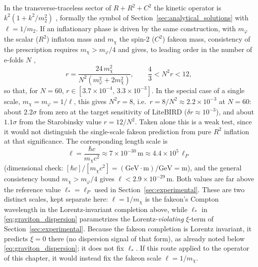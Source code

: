 \documentclass[11pt,a4paper,reqno]{amsart}
\theoremstyle{definition}
\numberwithin{equation}{section}
\begin{document}
In the transverse-traceless sector of $R + R^2 + C^2$ the kinetic operator is $k^2(1 + k^2/m_2^2)$ \cite{Stelle1978}, formally the symbol of Section~\ref{sec:analytical_solutions} with $\ell = 1/m_2$. If an inflationary phase is driven by the same construction, with $m_\varphi$ the scalar ($R^2$) inflaton mass and $m_\chi$ the spin-2 ($C^2$) fakeon mass, consistency of the prescription requires $m_\chi > m_\varphi/4$ and gives, to leading order in the number of e-folds $N$ \cite{ABP2020},
\begin{equation}
    \label{eq:fakeon_r}
    r = \frac{24\, m_\chi^2}{N^2\left( m_\varphi^2 + 2 m_\chi^2 \right)}, \qquad \frac{4}{3} < N^2 r < 12,
\end{equation}
so that, for $N = 60$, $r \in [3.7 \times 10^{-4},\, 3.3 \times 10^{-3}]$. In the special case of a single scale, $m_\chi = m_\varphi = 1/\ell$, this gives $N^2 r = 8$, i.e.\ $r = 8/N^2 \approx 2.2 \times 10^{-3}$ at $N = 60$: about $2.2\sigma$ from zero at the target sensitivity of LiteBIRD ($\delta r \approx 10^{-3}$), and about $1.1\sigma$ from the Starobinsky value $r = 12/N^2$. Taken alone this is a weak test, since it would not distinguish the single-scale fakeon prediction from pure $R^2$ inflation at that significance. The corresponding length scale is
\begin{equation}
    \ell = \frac{\hbar c}{m_\chi c^2} \approx 7 \times 10^{-30}\,\text{m} \approx 4.4 \times 10^5\, \ell_P
\end{equation}
(dimensional check: $[\hbar c]/[m_\chi c^2] = (\text{GeV}\cdot\text{m})/\text{GeV} = \text{m}$), and the general consistency bound $m_\chi > m_\varphi/4$ gives $\ell < 2.9 \times 10^{-29}\,\text{m}$. Both values are far above the reference value $\ell_\ast = \ell_P$ used in Section~\ref{sec:experimental}. These are two distinct scales, kept separate here: $\ell = 1/m_\chi$ is the fakeon's Compton wavelength in the Lorentz-invariant completion above, while $\ell_\ast$ in \eqref{eq:graviton_dispersion} parametrizes the Lorentz-\emph{violating} $\xi$-term of Section~\ref{sec:experimental}. Because the fakeon completion is Lorentz invariant, it predicts $\xi = 0$ there (no dispersion signal of that form), as already noted below \eqref{eq:graviton_dispersion}; it does not fix $\ell_\ast$. If this route applied to the operator of this chapter, it would instead fix the fakeon scale $\ell = 1/m_\chi$.
\end{document}
